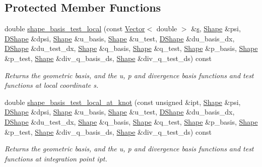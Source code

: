 \subsection*{Protected Member Functions}
\begin{DoxyCompactItemize}
\item 
double \hyperlink{classoomph_1_1TAxisymmetricPoroelasticityElement_aac2d7977167e87f6e7c3e3f3fef4a60c}{shape\+\_\+basis\+\_\+test\+\_\+local} (const \hyperlink{classoomph_1_1Vector}{Vector}$<$ double $>$ \&\hyperlink{cfortran_8h_ab7123126e4885ef647dd9c6e3807a21c}{s}, \hyperlink{classoomph_1_1Shape}{Shape} \&psi, \hyperlink{classoomph_1_1DShape}{D\+Shape} \&dpsi, \hyperlink{classoomph_1_1Shape}{Shape} \&u\+\_\+basis, \hyperlink{classoomph_1_1Shape}{Shape} \&u\+\_\+test, \hyperlink{classoomph_1_1DShape}{D\+Shape} \&du\+\_\+basis\+\_\+dx, \hyperlink{classoomph_1_1DShape}{D\+Shape} \&du\+\_\+test\+\_\+dx, \hyperlink{classoomph_1_1Shape}{Shape} \&q\+\_\+basis, \hyperlink{classoomph_1_1Shape}{Shape} \&q\+\_\+test, \hyperlink{classoomph_1_1Shape}{Shape} \&p\+\_\+basis, \hyperlink{classoomph_1_1Shape}{Shape} \&p\+\_\+test, \hyperlink{classoomph_1_1Shape}{Shape} \&div\+\_\+q\+\_\+basis\+\_\+ds, \hyperlink{classoomph_1_1Shape}{Shape} \&div\+\_\+q\+\_\+test\+\_\+ds) const
\begin{DoxyCompactList}\small\item\em Returns the geometric basis, and the u, p and divergence basis functions and test functions at local coordinate s. \end{DoxyCompactList}\item 
double \hyperlink{classoomph_1_1TAxisymmetricPoroelasticityElement_acc7a872515a68044fd5f379ca683cab1}{shape\+\_\+basis\+\_\+test\+\_\+local\+\_\+at\+\_\+knot} (const unsigned \&ipt, \hyperlink{classoomph_1_1Shape}{Shape} \&psi, \hyperlink{classoomph_1_1DShape}{D\+Shape} \&dpsi, \hyperlink{classoomph_1_1Shape}{Shape} \&u\+\_\+basis, \hyperlink{classoomph_1_1Shape}{Shape} \&u\+\_\+test, \hyperlink{classoomph_1_1DShape}{D\+Shape} \&du\+\_\+basis\+\_\+dx, \hyperlink{classoomph_1_1DShape}{D\+Shape} \&du\+\_\+test\+\_\+dx, \hyperlink{classoomph_1_1Shape}{Shape} \&q\+\_\+basis, \hyperlink{classoomph_1_1Shape}{Shape} \&q\+\_\+test, \hyperlink{classoomph_1_1Shape}{Shape} \&p\+\_\+basis, \hyperlink{classoomph_1_1Shape}{Shape} \&p\+\_\+test, \hyperlink{classoomph_1_1Shape}{Shape} \&div\+\_\+q\+\_\+basis\+\_\+ds, \hyperlink{classoomph_1_1Shape}{Shape} \&div\+\_\+q\+\_\+test\+\_\+ds) const
\begin{DoxyCompactList}\small\item\em Returns the geometric basis, and the u, p and divergence basis functions and test functions at integration point ipt. \end{DoxyCompactList}\end{DoxyCompactItemize}
